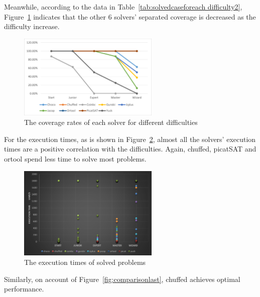 Meanwhile, according to the data in Table~\ref{tab:solvedcaseforeach difficulty2}, Figure~\ref{fig:mode2eva4} indicates that the other 6 solvers' separated coverage is decreased as the difficulty increase.
 \begin{figure}[H]
   \centering
    \includegraphics[width=0.6\textwidth]{figs/mode2seperatedcoverage.png}
    \caption{The coverage rates of each solver for different difficulties}
    \label{fig:mode2eva4}
\end{figure}
For the execution times, as is shown in Figure~\ref{fig:mode2time2}, almost all the solvers' execution times are a positive correlation with the difficulties. Again, chuffed, picatSAT and ortool spend less time to solve most problems. 
\begin{figure}[H]
    \centering
    \includegraphics[width=0.6\textwidth]{figs/time2all.png}
    \caption{The execution times of solved problems}
    \label{fig:mode2time2}
\end{figure}
Similarly, on account of Figure~\ref{fig:comparisonlast}, chuffed achieves optimal performance. 
